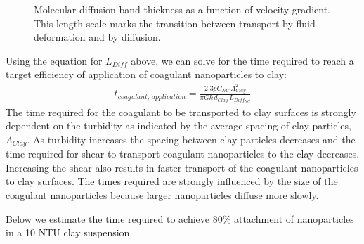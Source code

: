 \documentclass[letterpaper,10pt,english]{sphinxmanual}
\let\sphinxpxdimen\pdfpxdimen\else\newdimen\sphinxpxdimen
\begin{document}
\begin{figure}[htbp]
\centering
\capstart

\noindent\sphinxincludegraphics[width=400\sphinxpxdimen]{{Diffusion_band_thickness}.png}
\caption{Molecular diffusion band thickness as a function of velocity gradient. This length scale marks the transition between transport by fluid deformation and by diffusion.}\label{\detokenize{Rapid_Mix/RM_Theory_and_Future_Work:id3}}\label{\detokenize{Rapid_Mix/RM_Theory_and_Future_Work:figure-diffusion-band-thickness}}\end{figure}

Using the equation for \(L_{Diff}\) above, we can solve for  the time required to reach a target efficiency of application of coagulant nanoparticles to clay:
\begin{equation}\label{equation:Rapid_Mix/RM_Theory_and_Future_Work:Rapid_Mix/RM_Theory_and_Future_Work:37}
\begin{split}t_{coagulant, \, application} = \frac{2.3p C_{NC} \, \Lambda_{Clay}^2}{\pi G k \, d_{Clay}\,  L_{Diff_{NC}} }\end{split}
\end{equation}
The time required for the coagulant to be transported to clay surfaces is strongly dependent on the turbidity as indicated by the average spacing of clay particles, \(\Lambda_{Clay}\). As turbidity increases the spacing between clay particles decreases and the time required for shear to transport coagulant nanoparticles to the clay decreases. Increasing the shear also results in faster transport of the coagulant nanoparticles to clay surfaces. The times required are strongly influenced by the size of the coagulant nanoparticles because larger nanoparticles diffuse more slowly.

Below we estimate the time required to achieve 80\% attachment of nanoparticles in a 10 NTU clay suspension.
\end{document}
